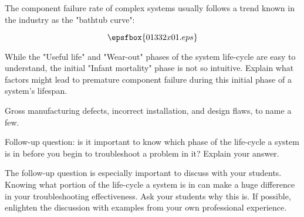 

The component failure rate of complex systems usually follows a trend known in the industry as the "bathtub curve":

$$\epsfbox{01332x01.eps}$$

While the "Useful life" and "Wear-out" phases of the system life-cycle are easy to understand, the initial "Infant mortality" phase is not so intuitive.  Explain what factors might lead to premature component failure during this initial phase of a system's lifespan.







Gross manufacturing defects, incorrect installation, and design flaws, to name a few.

\vskip 10pt

Follow-up question: is it important to know which phase of the life-cycle a system is in before you begin to troubleshoot a problem in it?  Explain your answer.







The follow-up question is especially important to discuss with your students.  Knowing what portion of the life-cycle a system is in can make a huge difference in your troubleshooting effectiveness.  Ask your students why this is.  If possible, enlighten the discussion with examples from your own professional experience.



